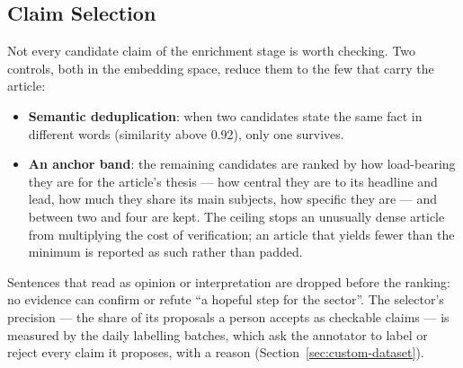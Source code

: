 
\subsection{Claim Selection}
\label{subsec:claim-selection}

Not every candidate claim of the enrichment stage is worth checking.
Two controls, both in the embedding space, reduce them to the few that
carry the article:

\begin{itemize}
    \item \textbf{Semantic deduplication}: when two candidates state the
    same fact in different words (similarity above 0.92), only one
    survives.
    \item \textbf{An anchor band}: the remaining candidates are ranked
    by how load-bearing they are for the article's thesis --- how
    central they are to its headline and lead, how much they share its
    main subjects, how specific they are --- and between two and four
    are kept. The ceiling stops an unusually dense article from
    multiplying the cost of verification; an article that yields fewer
    than the minimum is reported as such rather than padded.
\end{itemize}

Sentences that read as opinion or interpretation are dropped before the
ranking: no evidence can confirm or refute ``a hopeful step for the
sector''. The selector's precision --- the share of its proposals a
person accepts as checkable claims --- is measured by the daily
labelling batches, which ask the annotator to label or reject every
claim it proposes, with a reason (Section~\ref{sec:custom-dataset}).
